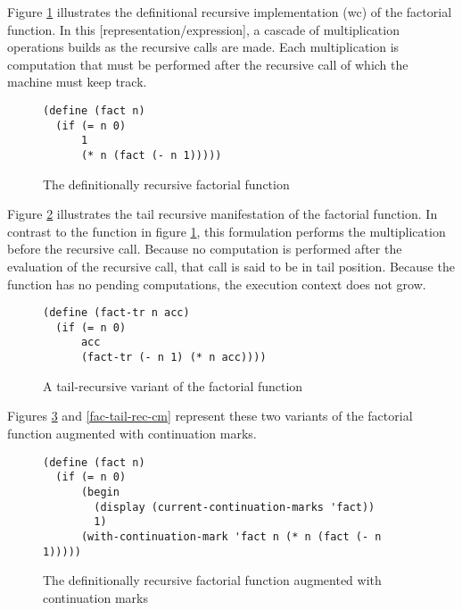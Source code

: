 \documentclass[ms]{byuprop}
\newcounter{definition}
\begin{document}
Figure \ref{fac-rec} illustrates the definitional recursive implementation (wc) of the
factorial function. In this [representation/expression], a cascade of multiplication
operations builds as the recursive calls are made. Each multiplication is computation that
must be performed after the recursive call of which the machine must keep track.


\begin{figure}
\label{fac-rec}
\begin{verbatim}
(define (fact n)
  (if (= n 0)
      1
      (* n (fact (- n 1)))))
\end{verbatim}
\caption{The definitionally recursive factorial function}
\end{figure}

Figure \ref{fac-tail-rec} illustrates the tail recursive manifestation of the factorial
function. In contrast to the function in figure \ref{fac-rec}, this formulation performs
the multiplication before the recursive call. Because no computation is performed after
the evaluation of the recursive call, that call is said to be in tail position. Because
the function has no pending computations, the execution context does not grow.

\begin{figure}
\label{fac-tail-rec}
\begin{verbatim}
(define (fact-tr n acc)
  (if (= n 0)
      acc
      (fact-tr (- n 1) (* n acc))))
\end{verbatim}
\caption{A tail-recursive variant of the factorial function}
\end{figure}

Figures \ref{fac-rec-cm} and \ref{fac-tail-rec-cm} represent these two variants of the
factorial function augmented with continuation marks.


\begin{figure}
\label{fac-rec-cm}
\begin{verbatim}
(define (fact n)
  (if (= n 0)
      (begin
        (display (current-continuation-marks 'fact))
        1)
      (with-continuation-mark 'fact n (* n (fact (- n 1)))))
\end{verbatim}
\caption{The definitionally recursive factorial function augmented with continuation marks}
\end{figure}
\end{document}
